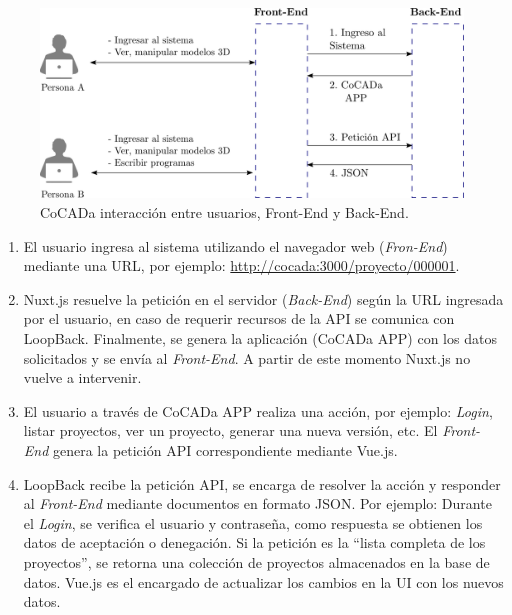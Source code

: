 \begin{figure}[ht]
    \includegraphics[width=12cm]{Img/Desarrollo/front-back.png}
    \centering
    \caption{\footnotesize{ CoCADa interacción entre usuarios, Front-End y Back-End. }}
    \label{fig:front-backend}
\end{figure}


\begin{enumerate}
    \item El usuario ingresa al sistema utilizando el navegador web (\textit{Fron-End}) mediante una URL, por ejemplo:  \url{http://cocada:3000/proyecto/000001}.
    
    \item Nuxt.js resuelve la petición en el servidor (\textit{Back-End}) según la URL ingresada por el usuario, 
    en caso de requerir recursos de la API se comunica con LoopBack. Finalmente, se genera la aplicación (CoCADa APP) con los datos solicitados y se envía al \textit{Front-End}. A partir de este momento Nuxt.js no vuelve a intervenir.  

   \item El usuario a través de CoCADa APP realiza una acción, por ejemplo: \textit{Login}, listar proyectos, ver un proyecto, generar una nueva versión, etc. El \textit{Front-End} genera la petición API correspondiente mediante Vue.js. %
   
   \item LoopBack recibe la petición API, se encarga de resolver la acción y responder al \textit{Front-End} mediante documentos en formato JSON. 
   Por ejemplo: Durante el \textit{Login}, se verifica el usuario y contraseña, como respuesta se obtienen los datos de aceptación o denegación. Si la petición es la ``lista completa de los proyectos'', se retorna una colección de proyectos almacenados en la base de datos. Vue.js es el encargado de actualizar los cambios en la UI con los nuevos datos.

\end{enumerate}

